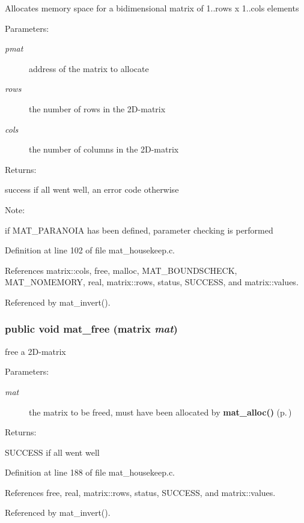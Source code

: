 Allocates memory space for a bidimensional matrix of 1..rows x 1..cols elements\begin{Desc}
\item[Parameters: ]\par
\begin{description}
\item[{\em 
pmat}]address of the matrix to allocate \item[{\em 
rows}]the number of rows in the 2D-matrix \item[{\em 
cols}]the number of columns in the 2D-matrix\end{description}
\end{Desc}
\begin{Desc}
\item[Returns: ]\par
success if all went well, an error code otherwise\end{Desc}
\begin{Desc}
\item[Note: ]\par
if MAT\_\-PARANOIA has been defined, parameter checking is performed \end{Desc}


Definition at line 102 of file mat\_\-housekeep.c.

References matrix::cols, free, malloc, MAT\_\-BOUNDSCHECK, MAT\_\-NOMEMORY, real, matrix::rows, status, SUCCESS, and matrix::values.

Referenced by mat\_\-invert().
\subsubsection{\setlength{\rightskip}{0pt plus 5cm}public void mat\_\-free ({\bf matrix} {\em mat})}\label{group__matrix__housekeeping_a1}


free a 2D-matrix

\begin{Desc}
\item[Parameters: ]\par
\begin{description}
\item[{\em 
mat}]the matrix to be freed, must have been allocated by {\bf mat\_\-alloc()} {\rm (p.\,\pageref{group__matrix__housekeeping_a0})}\end{description}
\end{Desc}
\begin{Desc}
\item[Returns: ]\par
SUCCESS if all went well \end{Desc}


Definition at line 188 of file mat\_\-housekeep.c.

References free, real, matrix::rows, status, SUCCESS, and matrix::values.

Referenced by mat\_\-invert().